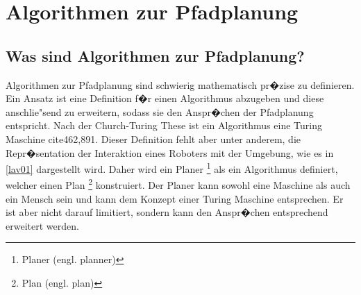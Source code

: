 
\chapter{Algorithmen zur Pfadplanung}
\section{Was sind Algorithmen zur Pfadplanung?}

Algorithmen zur Pfadplanung sind schwierig mathematisch pr�zise zu definieren. Ein Ansatz ist eine Definition f�r einen Algorithmus abzugeben und diese anschlie"send zu erweitern, sodass sie den Anspr�chen der Pfadplanung entspricht. Nach der Church-Turing These ist ein Algorithmus eine Turing Maschine cite{462,891}. Dieser Definition fehlt aber unter anderem, die Repr�sentation der Interaktion eines Roboters mit der Umgebung, wie es in \ref{lav01} dargestellt wird. Daher wird ein Planer \footnote{Planer (engl. planner)} als ein Algorithmus definiert, welcher einen Plan \footnote{Plan (engl. plan)} konstruiert. Der Planer kann sowohl eine Maschine als auch ein Mensch sein und kann dem Konzept einer Turing Maschine entsprechen. Er ist aber nicht darauf limitiert, sondern kann den Anspr�chen entsprechend erweitert werden.\cite[~S. 19ff]{Lav06} 

